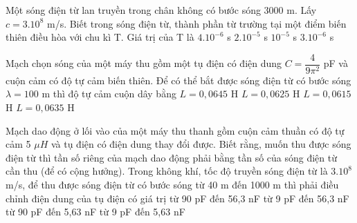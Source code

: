 \begin{vidu} %
 Một sóng điện từ lan truyền trong chân không có bước sóng 3000 m. Lấy $c=3.10^8$ m/s. Biết trong sóng điện từ, thành phần từ trường tại một điểm biến thiên điều hòa với chu kì T. Giá trị của T là
\choice
{$4.10^{-6}$ s}
{$2.10^{-5}$ s}
{\True $10^{-5}$ s}
{$3.10^{-6}$ s}
\end{vidu}
\begin{vidu} %
Mạch chọn sóng của một máy thu gồm một tụ điện có điện dung $C = \dfrac{4}{9\pi^2}$ pF và cuộn cảm có độ tự cảm biến thiên. Để có thể bắt được sóng điện từ có bước sóng $\lambda = 100$ m thì độ tự cảm cuộn dây bằng
\choice
{$L = 0,0645$ H}
{\True $L = 0,0625$ H}
{$L = 0,0615$ H}
{$L = 0,0635$ H}
\end{vidu}
\begin{vidu} %
 Mạch dao động ở lối vào của một máy thu thanh gồm cuộn cảm thuần có độ tự cảm 5 $\mu H$ và tụ điện có điện dung thay đổi được. Biết rằng, muốn thu được sóng điện từ thì tần số riêng của mạch dao động phải bằng tần số của sóng điện từ cần thu (để có cộng hưởng). Trong không khí, tốc độ truyền sóng điện từ là $3.10^8$ m/s, để thu được sóng điện từ có bước sóng từ 40 m đến 1000 m thì phải điều chỉnh điện dung của tụ điện có giá trị
\choice
{\True từ 90 pF đến 56,3 nF}
{từ 9 pF đến 56,3 nF}
{từ 90 pF đến 5,63 nF}
{từ 9 pF đến 5,63 nF}
\end{vidu}
